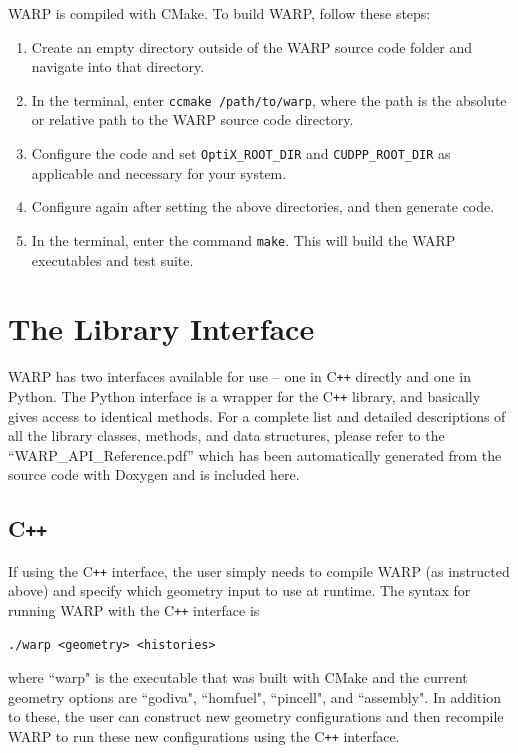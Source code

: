 \documentclass[twoside,a4paper]{refart}
\begin{document}
WARP is compiled with CMake. To build WARP, follow these steps:

\begin{enumerate}
\item{Create an empty directory outside of the WARP source code folder and navigate into that directory.}
\item{In the terminal, enter \texttt{ccmake /path/to/warp}, where the path is the absolute or relative 
path to the WARP source code directory.}
\item{Configure the code and set \texttt{OptiX\_ROOT\_DIR} and \texttt{CUDPP\_ROOT\_DIR} as applicable
and necessary for your system.}
\item{Configure again after setting the above directories, and then generate code.}
\item{In the terminal, enter the command \texttt{make}. This will build the WARP executables and test 
suite.}
\end{enumerate}

\section{The Library Interface}

WARP has two interfaces available for use -- one in C\texttt{++} directly and one in Python.  The Python 
interface is a wrapper for the C\texttt{++} library, and basically gives access to identical methods.  For
a complete list and detailed descriptions of all the library classes, methods, and data structures, please
refer to the ``WARP\_API\_Reference.pdf'' which has been automatically generated from the source code with
Doxygen and is included here.

\subsection{C\texttt{++}}

If using the C\texttt{++} interface, the user simply needs to compile WARP (as instructed above) and 
specify which geometry input to use at runtime. The syntax for running WARP with the C\texttt{++} 
interface is

\begin{verbatim}
./warp <geometry> <histories>
\end{verbatim}

where ``warp" is the executable that was built with CMake and the current geometry options are ``godiva",
``homfuel", ``pincell", and ``assembly". In addition to these, the user can construct new geometry
configurations and then recompile WARP to run these new configurations using the C\texttt{++} interface. 
\end{document}
